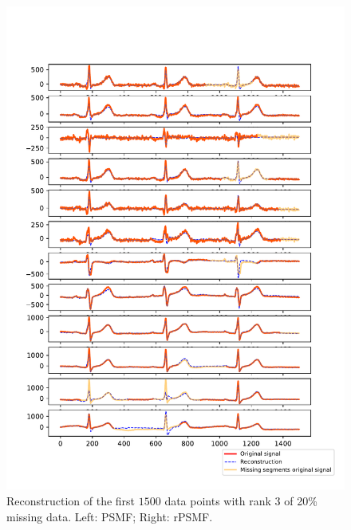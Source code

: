 \documentclass{mldsmsc}
\begin{document}
\begin{figure}[h!]
\begin{minipage}{0.4\linewidth}
    \includegraphics[width=\linewidth]{images/missing/rpsmf_output_20_3_half.pdf}
\end{minipage}
\caption{Reconstruction of the first $1500$ data points with rank 3 of 20\% missing data. Left: PSMF; Right: rPSMF.}
\label{fig:mrec3}
\end{figure}
\end{document}
